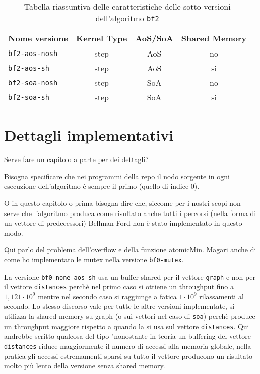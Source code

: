 \documentclass[a4paper]{article}
\begin{document}
	\begin{table}[!ht]
		\centering
		\begin{tabular}{|l|c|c|c|}
			\hline
			\textbf{Nome versione} & \textbf{Kernel Type} & \textbf{AoS/SoA} & \textbf{Shared Memory} \\ \hline
			\texttt{bf2-aos-nosh}  & step & AoS & no \\ \hline
			\texttt{bf2-aos-sh}    & step & AoS & si \\ \hline
			\texttt{bf2-soa-nosh}  & step & SoA & no \\ \hline
			\texttt{bf2-soa-sh}    & step & SoA & si \\ \hline
		\end{tabular}
		\label{tab:riassunto_bf1}
		\caption{Tabella riassuntiva delle caratteristiche delle sotto-versioni dell'algoritmo \texttt{bf2}}
	\end{table}
	
	\section{Dettagli implementativi}
	\label{section:impl}
	Serve fare un capitolo a parte per dei dettagli?
	
	Bisogna specificare che nei programmi della repo il nodo sorgente in ogni esecuzione dell'algoritmo è sempre il primo (quello di indice 0).
	
	O in questo capitolo o prima bisogna dire che, siccome per i nostri scopi non serve che l'algoritmo produca come risultato anche tutti i percorsi (nella forma di un vettore di predecessori) Bellman-Ford non è stato implementato in questo modo.
	
	Qui parlo del problema dell'overflow e della funzione atomicMin. Magari anche di come ho implementato le mutex nella versione \texttt{bf0-mutex}.
	
	La versione \texttt{bf0-none-aos-sh} usa un buffer shared per il vettore \texttt{graph} e non per il vettore \texttt{distances} perchè nel primo caso si ottiene un throughput fino a $1,121\cdot 10^9$ mentre nel secondo caso si raggiunge a fatica $1\cdot 10^9$ rilassamenti al secondo. Lo stesso discorso vale per tutte le altre versioni implementate, si utilizza la shared memory su graph (o sui vettori nel caso di \texttt{soa}) perchè produce un throughput maggiore rispetto a quando la si usa sul vettore \texttt{distances}. Qui andrebbe scritto qualcosa del tipo "nonostante in teoria un buffering del vettore \texttt{distances} riduce maggiormente il numero di accessi alla memoria globale, nella pratica gli accessi estremamenti sparsi su tutto il vettore producono un risultato molto più lento della versione senza shared memory.
	
\end{document}
